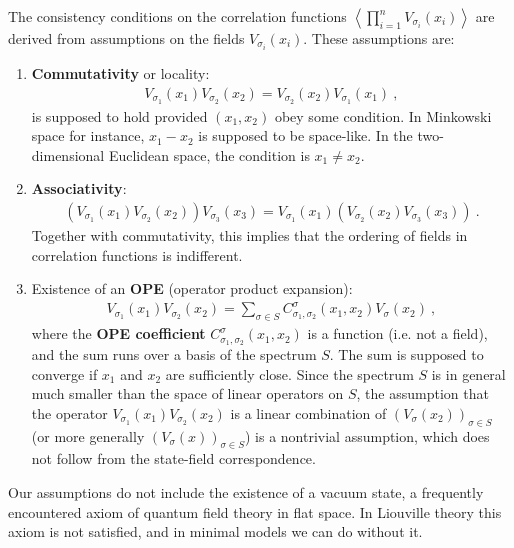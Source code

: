 \documentclass[12pt, a4paper, notitlepage, twoside]{report}
\numberwithin{equation}{section}
\theoremstyle{break}
\begin{document}
The consistency conditions on the correlation functions $\left\langle\prod_{i=1}^n V_{\sigma_i}(x_i)\right\rangle$ are derived from assumptions on the fields $V_{\sigma_i}(x_i)$.
These assumptions are:
\begin{enumerate}
 \item \textbf{Commutativity} or locality: 
\begin{align}
 \boxed{V_{\sigma_1}(x_1)V_{\sigma_2}(x_2) = V_{\sigma_2}(x_2) V_{\sigma_1}(x_1)}\ ,
\label{comm}
\end{align}
is supposed to hold provided $(x_1,x_2)$ obey some condition.
In Minkowski space for instance, $x_1-x_2$ is supposed to be space-like.
In the two-dimensional Euclidean space, the condition is $x_1\neq x_2$.
\item \textbf{Associativity}: 
\begin{align}
 \boxed{\left(V_{\sigma_1}(x_1)V_{\sigma_2}(x_2)\right) V_{\sigma_3}(x_3) = V_{\sigma_1}(x_1)  \left(V_{\sigma_2}(x_2) V_{\sigma_3}(x_3)\right)}\ .
\label{asso}
\end{align}
Together with commutativity, this implies that the ordering of fields in correlation functions is indifferent.
\item Existence of an \textbf{\boldmath OPE} (operator product expansion):
\begin{align}
 \boxed{V_{\sigma_1}(x_1)V_{\sigma_2}(x_2) = \sum_{\sigma\in S} C_{\sigma_1,\sigma_2}^{\sigma}(x_1,x_2) V_{\sigma}(x_2)}\ ,
\label{ope}
\end{align}
where the \textbf{\boldmath OPE coefficient} $C_{\sigma_1,\sigma_2}^{\sigma}(x_1,x_2)$ is a function (i.e.
not a field), and the sum runs over a basis of the spectrum $S$. 
The sum is supposed to converge if $x_1$ and $x_2$ are sufficiently close. 
Since the spectrum $S$ is in general much smaller than the space of linear operators on $S$, the assumption that the operator $V_{\sigma_1}(x_1)V_{\sigma_2}(x_2)$ is a linear combination of $(V_{\sigma}(x_2))_{\sigma\in S}$ (or more generally $(V_{\sigma}(x))_{\sigma\in S}$) is a nontrivial assumption, which does not follow from the state-field correspondence.
\end{enumerate}
Our assumptions do not include the existence of a vacuum state, a frequently encountered axiom of quantum field theory in flat space.
In Liouville theory this axiom is not satisfied, and in minimal models we can do without it. 
\end{document}
